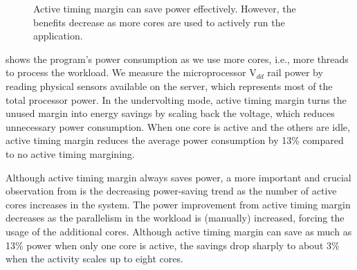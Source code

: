 \begin{figure}[t]
	\centering
    \caption{Active timing margin can save power effectively. However, the benefits decrease as more cores are used to actively run the application.}
    \label{fig:raytrace-inefficiency}
\end{figure}

 shows the program's power consumption as we use more cores, i.e., more threads to process the workload. We measure the microprocessor V$_{dd}$ rail power by reading physical sensors available on the server, which represents most of the total processor power. In the undervolting mode, active timing margin turns the unused margin into energy savings by scaling back the voltage, which reduces unnecessary power consumption. When one core is active and the others are idle, active timing margin reduces the average power consumption by 13\% compared to no active timing margining. 

Although active timing margin always saves power, a more important and crucial observation from  is the decreasing power-saving trend as the number of active cores increases in the system. The power improvement from active timing margin decreases as the parallelism in the workload is (manually) increased, forcing the usage of the additional cores. Although active timing margin can save as much as 13\% power when only one core is active, the savings drop sharply to about 3\% when the activity scales up to eight cores.

